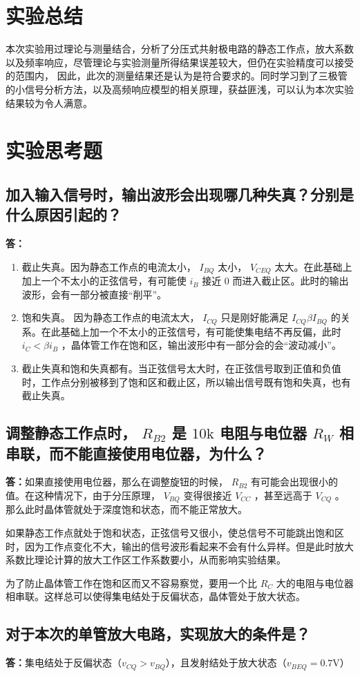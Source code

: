 \documentclass[a4paper,11pt,UTF8]{ctexart}
\begin{document}
\section{实验总结}
本次实验用过理论与测量结合，分析了分压式共射极电路的静态工作点，放大系数以及频率响应，尽管理论与实验测量所得结果误差较大，但仍在实验精度可以接受的范围内，
因此，此次的测量结果还是认为是符合要求的。同时学习到了三极管的小信号分析方法，以及高频响应模型的相关原理，获益匪浅，可以认为本次实验结果较为令人满意。
\section{实验思考题}
\subsection{加入输入信号时，输出波形会出现哪几种失真？分别是什么原因引起的？}
\textbf{答：}
\begin{enumerate}
 \item 截止失真。因为静态工作点的电流太小， $I_{BQ}$ 太小， $V_{CEQ}$ 太大。在此基础上加上一个不太小的正弦信号，有可能使 $i_B$ 接近 0 而进入截止区。此时的输出波形，会有一部分被直接“削平”。
 \item 饱和失真。 因为静态工作点的电流太大， $I_{CQ}$ 只是刚好能满足 $I_{CQ}\beta I_{BQ}$ 的关系。在此基础上加一个不太小的正弦信号，有可能使集电结不再反偏，此时 $i_C<\beta i_B$ ，晶体管工作在饱和区，输出波形中有一部分会的会“波动减小”。
 \item 截止失真和饱和失真都有。当正弦信号太大时，在正弦信号取到正值和负值时，工作点分别被移到了饱和区和截止区，所以输出信号既有饱和失真，也有截止失真。
\end{enumerate}

\subsection{调整静态工作点时， $R_{B2}$ 是 $10\mathrm{k}$ 电阻与电位器 $R_W$ 相串联，而不能直接使用电位器，为什么？}
\textbf{答：}如果直接使用电位器，那么在调整旋钮的时候， $R_{B2}$ 有可能会出现很小的值。在这种情况下，由于分压原理， $V_{BQ}$ 变得很接近 $V_{CC}$ ，甚至远高于 $V_{CQ}$ 。那么此时晶体管就处于深度饱和状态，而不能正常放大。
\par 如果静态工作点就处于饱和状态，正弦信号又很小，使总信号不可能跳出饱和区时，因为工作点变化不大，输出的信号波形看起来不会有什么异样。但是此时放大系数比理论计算的放大工作区工作系数要小，从而影响实验结果。
\par 为了防止晶体管工作在饱和区而又不容易察觉，要用一个比 $R_C$ 大的电阻与电位器相串联。这样总可以使得集电结处于反偏状态，晶体管处于放大状态。

\subsection{对于本次的单管放大电路，实现放大的条件是？}
\textbf{答：}集电结处于反偏状态（$v_{CQ}>v_{BQ}$），且发射结处于放大状态（$v_{BEQ}=0.7\mathrm{V}$）
\end{document}
